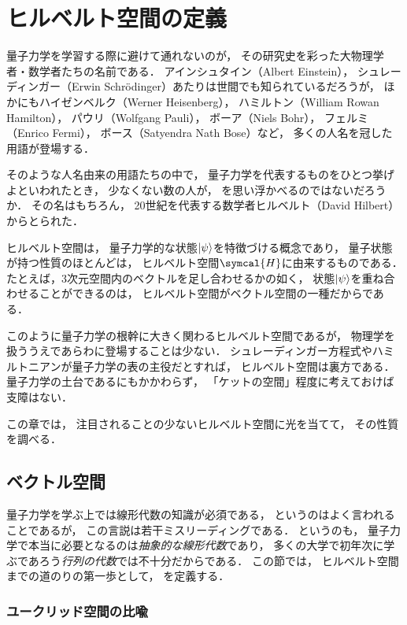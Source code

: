 \documentclass[
]{sotsu}
\begin{document}
\section{ヒルベルト空間の定義}
\label{sec:what-is-Hilbert-space}

量子力学を学習する際に避けて通れないのが，
その研究史を彩った大物理学者・数学者たちの名前である．
アインシュタイン（Albert Einstein），
シュレーディンガー（Erwin Schrödinger）あたりは世間でも知られているだろうが，
ほかにもハイゼンベルク（Werner Heisenberg），
ハミルトン（William Rowan Hamilton），
パウリ（Wolfgang Pauli），
ボーア（Niels Bohr），
フェルミ（Enrico Fermi），
ボース（Satyendra Nath Bose）など，
多くの人名を冠した用語が登場する．

そのような人名由来の用語たちの中で，
量子力学を代表するものをひとつ挙げよといわれたとき，
少なくない数の人が，
を思い浮かべるのではないだろうか．
その名はもちろん，
20世紀を代表する数学者ヒルベルト（David Hilbert）からとられた．

ヒルベルト空間は，
量子力学的な状態$\ket{\psi}$を特徴づける概念であり，
量子状態が持つ性質のほとんどは，
ヒルベルト空間$\symcal{H}$に由来するものである．
たとえば，3次元空間内のベクトルを足し合わせるかの如く，
状態$\ket{\psi}$を重ね合わせることができるのは，
ヒルベルト空間がベクトル空間の一種だからである．

このように量子力学の根幹に大きく関わるヒルベルト空間であるが，
物理学を扱ううえであらわに登場することは少ない．
シュレーディンガー方程式やハミルトニアンが量子力学の表の主役だとすれば，
ヒルベルト空間は裏方である．
量子力学の土台であるにもかかわらず，
「ケットの空間」程度に考えておけば支障はない．

この章では，
注目されることの少ないヒルベルト空間に光を当てて，
その性質を調べる．



\subsection{ベクトル空間}
\label{sec:vector-space}

量子力学を学ぶ上では線形代数の知識が必須である，
というのはよく言われることであるが，
この言説は若干ミスリーディングである．
というのも，
量子力学で本当に必要となるのは\emph{抽象的な線形代数}であり，
多くの大学で初年次に学ぶであろう\emph{行列の代数}では不十分だからである．
この節では，
ヒルベルト空間までの道のりの第一歩として，
を定義する．



\subsubsection{ユークリッド空間の比喩}
\label{sec:Euclidean-space}
\end{document}

